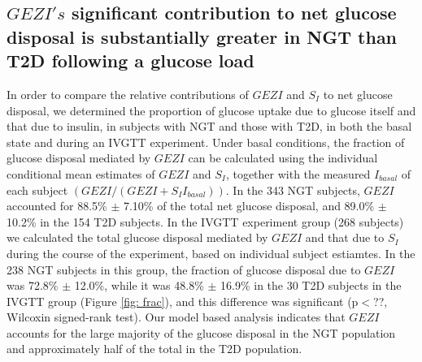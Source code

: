 \documentclass[utf8]{frontiersSCNS} %
\begin{document}
\subsection{$GEZI's$ significant contribution to net glucose disposal is substantially greater in NGT than T2D following a glucose load}
In order to compare the relative contributions of $GEZI$ and $S_I$ to net glucose disposal, we determined the proportion of glucose uptake due to glucose itself and that due to insulin, in subjects with NGT and those with T2D, in both the basal state and during an IVGTT experiment. Under basal conditions, the fraction of glucose disposal mediated by $GEZI$ can be calculated using the individual conditional mean estimates of $GEZI$ and $S_I$, together with the measured $I_{basal}$ of each subject $\left( {GEZI/\left( {GEZI + {S_I}{I_{basal}}} \right)} \right)$. In the 343 NGT subjects, $GEZI$ accounted for 88.5\% $\pm$ 7.10\% of the total net glucose disposal, and 89.0\% $\pm$ 10.2\% in the 154 T2D subjects. In the IVGTT experiment group (268 subjects) we calculated the total glucose disposal mediated by $GEZI$ and that due to $S_I$ during the course of the experiment, based on individual subject estiamtes. In the 238 NGT subjects in this group, the fraction of glucose disposal due to $GEZI$ was 72.8\% $\pm$ 12.0\%, while it was 48.8\% $\pm$ 16.9\% in the 30 T2D subjects in the IVGTT group (Figure \ref{fig: frac}), and this difference was significant (p$<$??, Wilcoxin signed-rank test). Our model based analysis indicates that $GEZI$ accounts for the large majority of the glucose disposal in the NGT population and approximately half of the total in the T2D population.  
\end{document}
